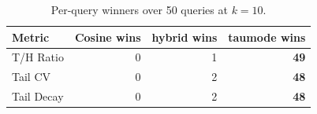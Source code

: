 \begin{table}[h]
\centering
\caption{Per-query winners over 50 queries at $k=10$.}
\begin{tabular}{lrrr}
\toprule
Metric & Cosine wins & hybrid wins & taumode wins \\
\midrule
T/H Ratio & 0 & 1 & \textbf{49} \\
Tail CV & 0 & 2 & \textbf{48} \\
Tail Decay & 0 & 2 & \textbf{48} \\
\bottomrule
\end{tabular}
\end{table}
